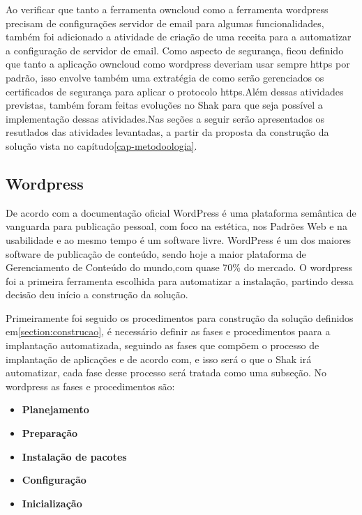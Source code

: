 Ao verificar que tanto a ferramenta owncloud como a ferramenta wordpress precisam
de configurações servidor de email para algumas funcionalidades, também foi adicionado
a atividade de criação de uma receita para a automatizar a configuração de
servidor de email. Como aspecto de segurança, ficou definido que tanto a aplicação
owncloud como wordpress deveriam usar sempre https por padrão, isso envolve também
uma extratégia de como serão gerenciados os certificados de segurança para aplicar
o protocolo https.Além dessas atividades previstas, também foram feitas evoluções
no Shak para que seja possível a implementação dessas atividades.Nas seções a
seguir serão apresentados os resutlados das atividades levantadas, a partir da
proposta da construção da solução vista no capítudo\ref{cap-metodoologia}.

\subsection{Wordpress}
\label{sub:wordpress}

De acordo com a documentação oficial\cite{wordpress} WordPress é uma plataforma
semântica de vanguarda para publicação pessoal, com foco na estética, nos
Padrões Web e na usabilidade e ao mesmo tempo é um software livre. WordPress é
um dos maiores software de publicação de conteúdo, sendo hoje a maior
plataforma de Gerenciamento de Conteúdo do mundo,com quase 70\% do mercado. O
wordpress foi a primeira ferramenta escolhida para automatizar a instalação, partindo
dessa decisão deu início a construção da solução.

Primeiramente foi seguido os procedimentos para construção da solução definidos em\ref{section:construcao}, é
necessário definir as fases e procedimentos paara a implantação automatizada,
seguindo as fases que compõem o processo de implantação de aplicações e de acordo
 com\cite{omg2006}, e isso será o que o Shak irá automatizar, cada fase desse processo
 será  tratada como uma subseção. No wordpress as fases e procedimentos são:

\begin{itemize}
  \item  \textbf{Planejamento}
  \item  \textbf{Preparação}
  \item  \textbf{Instalação de pacotes}
  \item  \textbf{Configuração}
  \item  \textbf{Inicialização}
\end{itemize}


